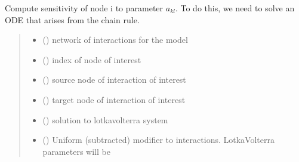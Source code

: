 \documentclass[letterpaper,10pt,english]{sphinxmanual}
\begin{document}
\begin{fulllineitems}
\label{\detokenize{sensit:sensitivity.get_sensitivity_single_trajectory}}
\pysigstartsignatures
{}
\pysigstopsignatures
\sphinxAtStartPar
Compute sensitivity of node i to parameter \(a_{kl}\). To do this, we need to solve an ODE that arises from the chain rule.
\begin{quote}\begin{description}
\begin{itemize}
\item {} 
\sphinxAtStartPar
{} ({\hyperref[\detokenize{friendlynets:friendlyNet.friendlyNet}]{}}) \textendash{} network of interactions for the model

\item {} 
\sphinxAtStartPar
{} () \textendash{} index of node of interest

\item {} 
\sphinxAtStartPar
{} () \textendash{} source node of interaction of interest

\item {} 
\sphinxAtStartPar
{} () \textendash{} target node of interaction of interest

\item {} 
\sphinxAtStartPar
{} () \textendash{} solution to lotka\sphinxhyphen{}volterra system 

\item {} 
\sphinxAtStartPar
{} () \textendash{} Uniform (subtracted) modifier to interactions. Lotka\sphinxhyphen{}Volterra parameters will be {\hyperref[\detokenize{friendlynets:friendlyNet.friendlyNet.Adjacency}]{}} \sphinxhyphen{} 


\end{itemize}
\end{description}
\end{quote}
\end{fulllineitems}
\end{document}
